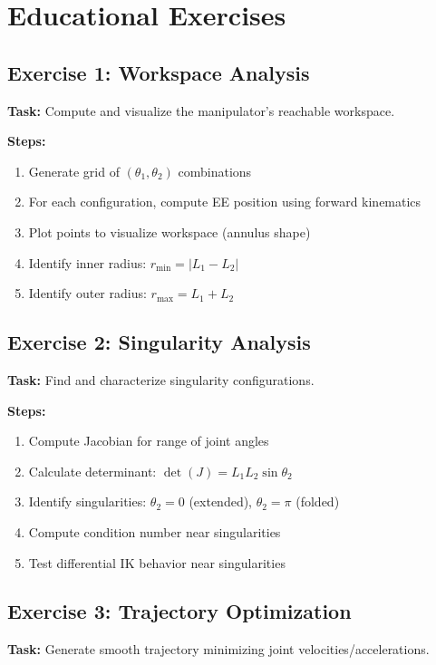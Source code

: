 \documentclass[11pt,a4paper]{article}
\begin{document}
\section{Educational Exercises}

\subsection{Exercise 1: Workspace Analysis}

\textbf{Task:} Compute and visualize the manipulator's reachable workspace.

\textbf{Steps:}
\begin{enumerate}
    \item Generate grid of $(\theta_1, \theta_2)$ combinations
    \item For each configuration, compute EE position using forward kinematics
    \item Plot points to visualize workspace (annulus shape)
    \item Identify inner radius: $r_{\min} = |L_1 - L_2|$
    \item Identify outer radius: $r_{\max} = L_1 + L_2$
\end{enumerate}

\subsection{Exercise 2: Singularity Analysis}

\textbf{Task:} Find and characterize singularity configurations.

\textbf{Steps:}
\begin{enumerate}
    \item Compute Jacobian for range of joint angles
    \item Calculate determinant: $\det(J) = L_1 L_2 \sin\theta_2$
    \item Identify singularities: $\theta_2 = 0$ (extended), $\theta_2 = \pi$ (folded)
    \item Compute condition number near singularities
    \item Test differential IK behavior near singularities
\end{enumerate}

\subsection{Exercise 3: Trajectory Optimization}

\textbf{Task:} Generate smooth trajectory minimizing joint velocities/accelerations.
\end{document}
